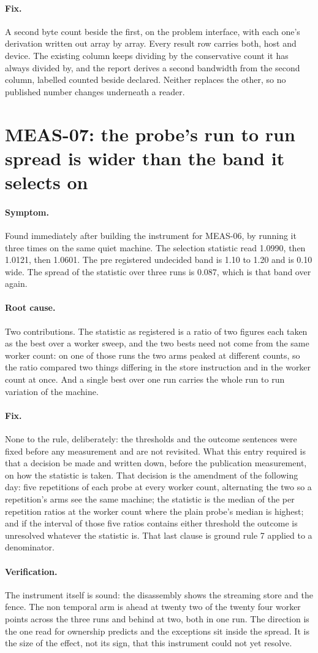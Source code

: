 \documentclass[11pt,a4paper]{report}
\newcommand{\symptom}[1]{\paragraph{Symptom.}#1}
\newcommand{\rootcause}[1]{\paragraph{Root cause.}#1}
\newcommand{\fix}[1]{\paragraph{Fix.}#1}
\newcommand{\verification}[1]{\paragraph{Verification.}#1}
\begin{document}
\fix{A second byte count beside the first, on the problem interface, with each
one's derivation written out array by array. Every result row carries both, host
and device. The existing column keeps dividing by the conservative count it has
always divided by, and the report derives a second bandwidth from the second
column, labelled counted beside declared. Neither replaces the other, so no
published number changes underneath a reader.}

\section{MEAS-07: the probe's run to run spread is wider than the band it selects on}

\symptom{Found immediately after building the instrument for MEAS-06, by running
it three times on the same quiet machine. The selection statistic read 1.0990,
then 1.0121, then 1.0601. The pre registered undecided band is 1.10 to 1.20 and
is 0.10 wide. The spread of the statistic over three runs is 0.087, which is that
band over again.}

\rootcause{Two contributions. The statistic as registered is a ratio of two
figures each taken as the best over a worker sweep, and the two bests need not
come from the same worker count: on one of those runs the two arms peaked at
different counts, so the ratio compared two things differing in the store
instruction and in the worker count at once. And a single best over one run
carries the whole run to run variation of the machine.}

\fix{None to the rule, deliberately: the thresholds and the outcome sentences
were fixed before any measurement and are not revisited. What this entry required
is that a decision be made and written down, before the publication measurement,
on how the statistic is taken. That decision is the amendment of the following
day: five repetitions of each probe at every worker count, alternating the two so
a repetition's arms see the same machine; the statistic is the median of the per
repetition ratios at the worker count where the plain probe's median is highest;
and if the interval of those five ratios contains either threshold the outcome is
unresolved whatever the statistic is. That last clause is ground rule 7 applied
to a denominator.}

\verification{The instrument itself is sound: the disassembly shows the streaming
store and the fence. The non temporal arm is ahead at twenty two of the twenty
four worker points across the three runs and behind at two, both in one run. The
direction is the one read for ownership predicts and the exceptions sit inside
the spread. It is the size of the effect, not its sign, that this instrument
could not yet resolve.}
\end{document}

